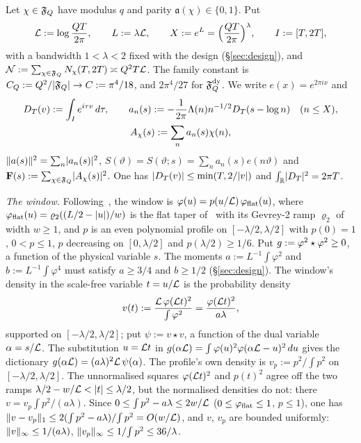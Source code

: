 Let $\chi\in\mathfrak F_Q$ have modulus $q$ and parity $\mathfrak a(\chi)\in\{0,1\}$. Put
\[
\mathcal L:=\log\frac{QT}{2\pi},\qquad L:=\lambda\mathcal L,\qquad X:=e^{L}=\Bigl(\frac{QT}{2\pi}\Bigr)^{\lambda},\qquad I:=[T,2T],
\]
with a bandwidth $1<\lambda<2$ fixed with the design (\S\ref{sec:design}), and $\mathcal N:=\sum_{\chi\in\mathfrak F_Q}N_\chi(T,2T)\asymp Q^2T\mathcal L$.
The family constant is $C_Q:=Q^2/\lvert \mathfrak F_Q\rvert\to C:=\pi^4/18$, and $2\pi^4/27$ for $\mathfrak F_Q^{\rm dy}$. We write $e(x)=e^{2\pi ix}$ and
\begin{gather*}
D_T(v):=\int_I e^{i\tau v}\,d\tau,\qquad a_n(s):=-\frac1{2\pi}\Lambda(n)n^{-1/2}D_T(s-\log n)\quad(n\le X),\\
A_\chi(s):=\sum_na_n(s)\chi(n),
\end{gather*}
$\lVert a(s)\rVert^2=\sum_n\lvert a_n(s)\rvert^2$, $S(\vartheta)=S(\vartheta;s)=\sum_na_n(s)e(n\vartheta)$ and $\mathbf F(s):=\sum_{\chi\in\mathfrak F_Q}\lvert A_\chi(s)\rvert^2$.
One has $\lvert D_T(v)\rvert\le\min(T,2/\lvert v\rvert)$ and $\int_{\mathbb R}\lvert D_T\rvert^2=2\pi T$.

\emph{The window.} Following~\cite{DSouza}, the window is $\varphi(u)=p(u/\mathcal L)\,\varphi_{\rm flat}(u)$, where
$\varphi_{\rm flat}(u)=\varrho_2((L/2-\lvert u\rvert)/w)$ is the flat taper of~\cite{AF} with its Gevrey-2 ramp $\varrho_2$ of width
$w\ge1$, and $p$ is an even polynomial profile on $[-\lambda/2,\lambda/2]$ with $p(0)=1$, $0<p\le1$, $p$ decreasing on
$[0,\lambda/2]$ and $p(\lambda/2)\ge1/6$. Put $g:=\varphi^2\star\varphi^2\ge0$, a function of the physical variable $s$.
The moments $a:=L^{-1}\int\varphi^2$ and $b:=L^{-1}\int\varphi^4$ must satisfy $a\ge3/4$ and $b\ge1/2$ (\S\ref{sec:design}).
The window's density in the scale-free variable $t=u/\mathcal L$ is the probability density
\[
v(t):=\frac{\mathcal L\,\varphi(\mathcal L t)^2}{\int\varphi^2}=\frac{\varphi(\mathcal L t)^2}{a\lambda},
\]
supported on $[-\lambda/2,\lambda/2]$; put $\psi:=v\star v$, a function of the dual variable $\alpha=s/\mathcal L$. The substitution $u=\mathcal L t$ in
$g(\alpha\mathcal L)=\int\varphi(u)^2\varphi(\alpha\mathcal L-u)^2\,du$ gives the dictionary $g(\alpha\mathcal L)=(a\lambda)^2\mathcal L\,\psi(\alpha)$.
The profile's own density is $v_p:=p^2/\!\int p^2$ on $[-\lambda/2,\lambda/2]$. The unnormalised squares $\varphi(\mathcal L t)^2$ and $p(t)^2$ agree off the
two ramps $\lambda/2-w/\mathcal L<\lvert t\rvert\le\lambda/2$, but the normalised densities do not: there $v=v_p\int p^2/(a\lambda)$. Since
$0\le\int p^2-a\lambda\le2w/\mathcal L$ ($0\le\varphi_{\rm flat}\le1$, $p\le1$), one has $\lVert v-v_p\rVert_1\le2(\int p^2-a\lambda)/\!\int p^2=O(w/\mathcal L)$, and $v$,
$v_p$ are bounded uniformly: $\lVert v\rVert_\infty\le1/(a\lambda)$, $\lVert v_p\rVert_\infty\le1/\!\int p^2\le36/\lambda$.

